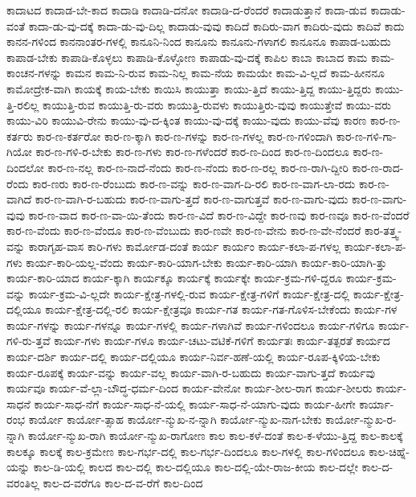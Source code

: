 {ಕಾದಾಟದ
ಕಾದಾಡ-ಬೇ-ಕಾದ
ಕಾದಾಡಿ
ಕಾದಾಡಿ-ದನೋ
ಕಾದಾಡಿ-ದ-ರೆಂದರೆ
ಕಾದಾಡುತ್ತಾನೆ
ಕಾದಾ-ಡುವ
ಕಾದಾಡು-ವಂತೆ
ಕಾದಾ-ಡು-ವು-ದಕ್ಕೆ
ಕಾದಾ-ಡು-ವು-ದಿಲ್ಲ
ಕಾದಾಡು-ವುವು
ಕಾದಿದೆ
ಕಾದಿರು-ವಾಗ
ಕಾದಿರು-ವುದು
ಕಾದಿವೆ
ಕಾದು
ಕಾನನ-ಗಳಿಂದ
ಕಾನನಾಂತರ-ಗಳಲ್ಲಿ
ಕಾನೂನಿ-ನಿಂದ
ಕಾನೂನು
ಕಾನೂನು-ಗಳಾಗಲಿ
ಕಾನೂನೂ
ಕಾಪಾಡ-ಬಹುದು
ಕಾಪಾಡ-ಬೇಕು
ಕಾಪಾಡಿ-ಕೊಳ್ಳಲು
ಕಾಪಾಡಿ-ಕೊಳ್ಳೋಣ
ಕಾಪಾಡು-ವು-ದಕ್ಕೆ
ಕಾಪಿಲ
ಕಾಬಾ
ಕಾಬಾದ
ಕಾಮ
ಕಾಮ-ಕಾಂಚನ-ಗಳನ್ನು
ಕಾಮನ
ಕಾಮ-ನಿ-ರುವ
ಕಾಮ-ನಿಲ್ಲ
ಕಾಮ-ನೆಯ
ಕಾಮಯೇ
ಕಾಮ-ವಿ-ಲ್ಲದೆ
ಕಾಮ-ಹೀನನೂ
ಕಾಮೋದ್ರೇಕ-ವಾಗಿ
ಕಾಯಕ್ಕೆ
ಕಾಯ-ಬೇಕು
ಕಾಯಿಸಿ
ಕಾಯುತ್ತಾ
ಕಾಯು-ತ್ತಿದೆ
ಕಾಯು-ತ್ತಿದ್ದ
ಕಾಯು-ತ್ತಿದ್ದರು
ಕಾಯು-ತ್ತಿ-ರಲಿಲ್ಲ
ಕಾಯುತ್ತಿ-ರುವ
ಕಾಯುತ್ತಿ-ರು-ವರು
ಕಾಯುತ್ತಿ-ರುವಳು
ಕಾಯುತ್ತಿರು-ವುವು
ಕಾಯುತ್ತೇವೆ
ಕಾಯು-ವರು
ಕಾಯು-ವಿರಿ
ಕಾಯುವಿ-ರೇನು
ಕಾಯು-ವು-ದ-ಕ್ಕಿಂತ
ಕಾಯು-ವು-ದಕ್ಕೆ
ಕಾಯು-ವುದು
ಕಾಯು-ವೆವು
ಕಾರಣ
ಕಾರ-ಣ-ಕರ್ತರು
ಕಾರ-ಣ-ಕರ್ತರೋ
ಕಾರ-ಣ-ಕ್ಕಾಗಿ
ಕಾರ-ಣ-ಗಳನ್ನು
ಕಾರ-ಣ-ಗಳಲ್ಲ
ಕಾರ-ಣ-ಗಳಿಂದಾಗಿ
ಕಾರ-ಣ-ಗಳಿ-ಗಾ-ಗಿಯೋ
ಕಾರ-ಣ-ಗಳಿ-ರ-ಬೇಕು
ಕಾರ-ಣ-ಗಳು
ಕಾರ-ಣ-ಗಳೆಂದರೆ
ಕಾರ-ಣ-ದಿಂದ
ಕಾರ-ಣ-ದಿಂದಲೂ
ಕಾರ-ಣ-ದಿಂದಲೋ
ಕಾರ-ಣ-ನಲ್ಲ
ಕಾರ-ಣ-ನಾದೆ-ನೆಂದು
ಕಾರ-ಣ-ನೆಂದು
ಕಾರ-ಣ-ರಲ್ಲ
ಕಾರ-ಣ-ರಾಗಿ-ದ್ದೀರಿ
ಕಾರ-ಣ-ರಾದ-ರೆಂದು
ಕಾರ-ಣರು
ಕಾರ-ಣ-ರೆಂಬುದು
ಕಾರ-ಣ-ವನ್ನು
ಕಾರ-ಣ-ವಾಗ-ದಿ-ರಲಿ
ಕಾರ-ಣ-ವಾಗ-ಲಾ-ರದು
ಕಾರ-ಣ-ವಾಗಿದೆ
ಕಾರ-ಣ-ವಾಗಿ-ರ-ಬಹುದು
ಕಾರ-ಣ-ವಾಗು-ತ್ತದೆ
ಕಾರ-ಣ-ವಾಗುತ್ತವೆ
ಕಾರ-ಣ-ವಾಗು-ವುದು
ಕಾರ-ಣ-ವಾಗು-ವುವು
ಕಾರ-ಣ-ವಾದ
ಕಾರ-ಣ-ವಾ-ಯಿ-ತೆಂದು
ಕಾರ-ಣ-ವಿದೆ
ಕಾರ-ಣ-ವಿದ್ದೇ
ಕಾರ-ಣವು
ಕಾರ-ಣವೂ
ಕಾರ-ಣ-ವೆಂದರೆ
ಕಾರ-ಣ-ವೆಂದು
ಕಾರ-ಣ-ವೆಂದೂ
ಕಾರ-ಣ-ವೆಂಬುದು
ಕಾರ-ಣವೇ
ಕಾರ-ಣ-ವೇನು
ಕಾರ-ಣ-ವೇ-ನೆಂದರೆ
ಕಾರ-ತತ್ತ್ವ-ವನ್ನು
ಕಾರಾಗೃಹ-ವಾಸ
ಕಾರಿ-ಗಳು
ಕಾರ್ಮೋಡ-ದಂತೆ
ಕಾರ್ಯ
ಕಾರ್ಯಂ
ಕಾರ್ಯ-ಕಲಾ-ಪ-ಗಳಲ್ಲ
ಕಾರ್ಯ-ಕಲಾ-ಪ-ಗಳು
ಕಾರ್ಯ-ಕಾರಿ-ಯಲ್ಲ-ವೆಂದು
ಕಾರ್ಯ-ಕಾರಿ-ಯಾಗ-ಬೇಕು
ಕಾರ್ಯ-ಕಾರಿ-ಯಾಗಿ
ಕಾರ್ಯ-ಕಾರಿ-ಯಾಗಿ-ತ್ತು
ಕಾರ್ಯ-ಕಾರಿ-ಯಾದ
ಕಾರ್ಯ-ಕ್ಕಾಗಿ
ಕಾರ್ಯಕ್ಕೂ
ಕಾರ್ಯಕ್ಕೆ
ಕಾರ್ಯಕ್ಕೇ
ಕಾರ್ಯ-ಕ್ರಮ-ಗಳಿ-ದ್ದರೂ
ಕಾರ್ಯ-ಕ್ರಮ-ವನ್ನು
ಕಾರ್ಯ-ಕ್ರಮ-ವಿ-ಲ್ಲದೇ
ಕಾರ್ಯ-ಕ್ಷೇತ್ರ-ಗಳಲ್ಲಿ-ರುವ
ಕಾರ್ಯ-ಕ್ಷೇತ್ರ-ಗಳಿಗೆ
ಕಾರ್ಯ-ಕ್ಷೇತ್ರ-ದಲ್ಲಿ
ಕಾರ್ಯ-ಕ್ಷೇತ್ರ-ದಲ್ಲಿಯೂ
ಕಾರ್ಯ-ಕ್ಷೇತ್ರ-ದಲ್ಲಿ-ರಲಿ
ಕಾರ್ಯ-ಕ್ಷೇತ್ರವೂ
ಕಾರ್ಯ-ಗತ
ಕಾರ್ಯ-ಗತ-ಗೊಳಿಸ-ಬೇಕೆಂದು
ಕಾರ್ಯ-ಗಳ
ಕಾರ್ಯ-ಗಳನ್ನು
ಕಾರ್ಯ-ಗಳನ್ನೂ
ಕಾರ್ಯ-ಗಳಲ್ಲಿ
ಕಾರ್ಯ-ಗಳಾಗಿವೆ
ಕಾರ್ಯ-ಗಳಿಂದಲೂ
ಕಾರ್ಯ-ಗಳಿಗೂ
ಕಾರ್ಯ-ಗಳಿ-ರು-ತ್ತವೆ
ಕಾರ್ಯ-ಗಳು
ಕಾರ್ಯ-ಗಳೂ
ಕಾರ್ಯ-ಚಟು-ವಟಿಕೆ-ಗಳಿಗೆ
ಕಾರ್ಯತಃ
ಕಾರ್ಯ-ತತ್ಪರತೆ
ಕಾರ್ಯದ
ಕಾರ್ಯ-ದರ್ಶಿ
ಕಾರ್ಯ-ದಲ್ಲಿ
ಕಾರ್ಯ-ದಲ್ಲಿಯೂ
ಕಾರ್ಯ-ನಿರ್ವ-ಹಣೆ-ಯಲ್ಲಿ
ಕಾರ್ಯ-ರೂಪ-ಕ್ಕಿಳಿಯ-ಬೇಕು
ಕಾರ್ಯ-ರೂಪಕ್ಕೆ
ಕಾರ್ಯ-ವನ್ನು
ಕಾರ್ಯ-ವಲ್ಲ
ಕಾರ್ಯ-ವಾಗಿ-ರ-ಬಹುದು
ಕಾರ್ಯ-ವಾಗು-ತ್ತದೆ
ಕಾರ್ಯವು
ಕಾರ್ಯವೂ
ಕಾರ್ಯ-ವೆ-ಲ್ಲಾ-ಬೌದ್ಧ-ಧರ್ಮ-ದಿಂದ
ಕಾರ್ಯ-ವೇನೋ
ಕಾರ್ಯ-ಶೀಲ-ರಾಗ
ಕಾರ್ಯ-ಶೀಲರು
ಕಾರ್ಯ-ಸಾಧನೆ
ಕಾರ್ಯ-ಸಾಧ-ನೆಗೆ
ಕಾರ್ಯ-ಸಾಧ-ನೆ-ಯಲ್ಲಿ
ಕಾರ್ಯ-ಸಾಧ-ನೆ-ಯಾಗು-ವುದು
ಕಾರ್ಯ-ಹೀಗೇ
ಕಾರ್ಯಾ-ರಂಭ
ಕಾರ್ಯೋ
ಕಾರ್ಯೋ-ತ್ಸಾಹ
ಕಾರ್ಯೋ-ನ್ಮುಖ-ನ-ನ್ನಾಗಿ
ಕಾರ್ಯೋ-ನ್ಮುಖ-ನಾಗ-ಬೇಕು
ಕಾರ್ಯೋ-ನ್ಮುಖ-ರ-ನ್ನಾಗಿ
ಕಾರ್ಯೋ-ನ್ಮುಖ-ರಾಗಿ
ಕಾರ್ಯೋ-ನ್ಮುಖ-ರಾಗೋಣ
ಕಾಲ
ಕಾಲ-ಕಳೆ-ದಂತೆ
ಕಾಲ-ಕ-ಳೆಯು-ತ್ತಿದ್ದ
ಕಾಲ-ಕಾಲಕ್ಕೆ
ಕಾಲಕ್ಕೂ
ಕಾಲಕ್ಕೆ
ಕಾಲ-ಕ್ರಮೇಣ
ಕಾಲ-ಗರ್ಭ-ದಲ್ಲಿ
ಕಾಲ-ಗರ್ಭ-ದಿಂದಲೂ
ಕಾಲ-ಗಳಲ್ಲಿ
ಕಾಲ-ಗಳಿಂದಲೂ
ಕಾಲ-ಚಿಹ್ನೆ-ಯನ್ನು
ಕಾಲ-ಡಿ-ಯಲ್ಲಿ
ಕಾಲದ
ಕಾಲ-ದಲ್ಲಿ
ಕಾಲ-ದಲ್ಲಿಯೂ
ಕಾಲ-ದಲ್ಲಿ-ಯೇ-ರಾಜ-ಕೀಯ
ಕಾಲ-ದಲ್ಲೇ
ಕಾಲ-ದ-ವರಂತಿಲ್ಲ
ಕಾಲ-ದ-ವರೆಗೂ
ಕಾಲ-ದ-ವ-ರೆಗೆ
ಕಾಲ-ದಿಂದ
}
